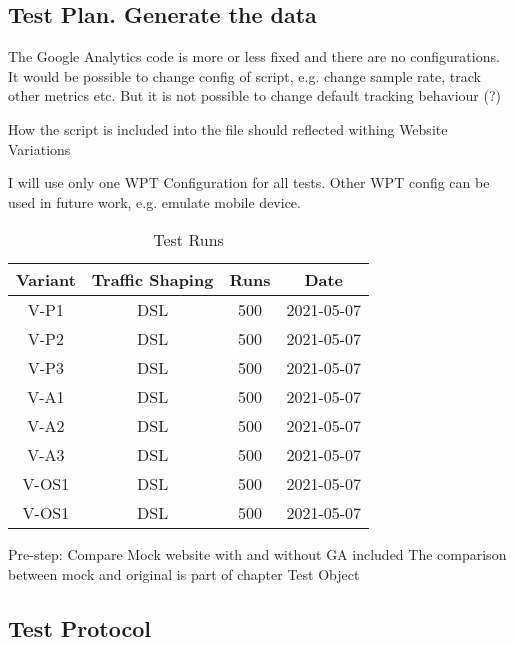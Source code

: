 

\subsection{Test Plan. Generate the data}

The Google Analytics code is more or less fixed and there are no configurations.
It would be possible to change config of script, e.g. change sample rate, track other metrics etc.
But it is not possible to change default tracking behaviour (?)

How the script is included into the file should reflected withing Website Variations

I will use only one WPT Configuration for all tests.
Other WPT config can be used in future work, e.g. emulate mobile device.


\begin{table}[h]
	\caption[Test Runs]{Test Runs \cite{DBLP:books/infix/Schwarz99}}
	\label{tab:tamodelleVergleich}
	\centering
	\begin{tabular}{ |c|c|c|c| } 
	 \hline
	  Variant & Traffic Shaping & Runs & Date \\
	  \hline
	  V-P1 & DSL & 500 & 2021-05-07 \\
	  V-P2 & DSL & 500 & 2021-05-07 \\
	  V-P3 & DSL & 500 & 2021-05-07 \\
	  \hline
	  V-A1 & DSL & 500 & 2021-05-07 \\
	  V-A2 & DSL & 500 & 2021-05-07 \\
	  V-A3 & DSL & 500 & 2021-05-07 \\
	  \hline
	  V-OS1 & DSL & 500 & 2021-05-07 \\
	  V-OS1 & DSL & 500 & 2021-05-07 \\
	  \hline
	  \end{tabular}
\end{table}



Pre-step: Compare Mock website with and without GA included
The comparison between mock and original is part of chapter Test Object




\subsection{Test Protocol}

